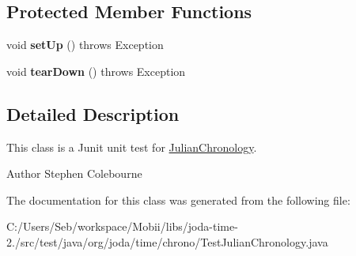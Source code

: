 \subsection*{Protected Member Functions}
\begin{DoxyCompactItemize}
\item 
\hypertarget{classorg_1_1joda_1_1time_1_1chrono_1_1_test_julian_chronology_a8260d297c14940a3177e6171181a48c4}{void {\bfseries set\-Up} ()  throws Exception }\label{classorg_1_1joda_1_1time_1_1chrono_1_1_test_julian_chronology_a8260d297c14940a3177e6171181a48c4}

\item 
\hypertarget{classorg_1_1joda_1_1time_1_1chrono_1_1_test_julian_chronology_a3e02efdda57cacb2032baeb9fb6f03c4}{void {\bfseries tear\-Down} ()  throws Exception }\label{classorg_1_1joda_1_1time_1_1chrono_1_1_test_julian_chronology_a3e02efdda57cacb2032baeb9fb6f03c4}

\end{DoxyCompactItemize}


\subsection{Detailed Description}
This class is a Junit unit test for \hyperlink{classorg_1_1joda_1_1time_1_1chrono_1_1_julian_chronology}{Julian\-Chronology}.

\begin{DoxyAuthor}{Author}
Stephen Colebourne 
\end{DoxyAuthor}


The documentation for this class was generated from the following file\-:\begin{DoxyCompactItemize}
\item 
C\-:/\-Users/\-Seb/workspace/\-Mobii/libs/joda-\/time-\/2./src/test/java/org/joda/time/chrono/Test\-Julian\-Chronology.\-java\end{DoxyCompactItemize}
